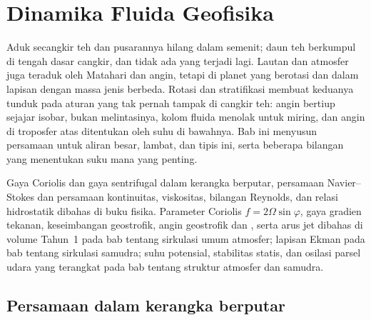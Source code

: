\chapter{Dinamika Fluida Geofisika}\label{ch:b3:gfd-foundations}

Aduk secangkir teh dan pusarannya hilang dalam semenit; daun teh berkumpul di
tengah dasar cangkir, dan tidak ada yang terjadi lagi. Lautan dan atmosfer
juga teraduk oleh Matahari dan angin, tetapi di planet yang berotasi dan dalam
lapisan dengan massa jenis berbeda. Rotasi dan stratifikasi membuat keduanya tunduk
pada aturan yang tak pernah tampak di cangkir teh: angin bertiup sejajar isobar,
bukan melintasinya, kolom fluida menolak untuk miring, dan angin di troposfer atas
ditentukan oleh suhu di bawahnya. Bab ini menyusun persamaan untuk
aliran besar, lambat, dan tipis ini, serta beberapa bilangan yang
menentukan suku mana yang penting.

\begin{recall}
Gaya Coriolis dan gaya sentrifugal dalam kerangka berputar, persamaan Navier--Stokes
dan persamaan kontinuitas, viskositas, bilangan Reynolds, dan relasi hidrostatik
dibahas di buku fisika. Parameter Coriolis $f = 2\Omega
\sin\varphi$, gaya gradien tekanan, keseimbangan geostrofik,
angin geostrofik dan , serta arus jet dibahas di volume Tahun~1
pada bab tentang sirkulasi umum atmosfer;
lapisan Ekman pada bab tentang sirkulasi samudra; suhu potensial,
stabilitas statis, dan osilasi parsel udara yang terangkat pada
bab tentang struktur atmosfer dan samudra.
\end{recall}

\section{Persamaan dalam kerangka berputar}\label{sec:b3:gfd-foundations:equations}

